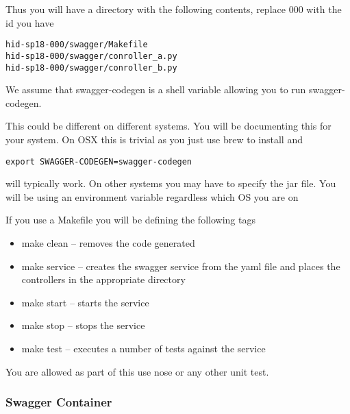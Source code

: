 \begin{exercise}
 

Thus you will have a directory with the following contents, replace
000 with the id you have

 
\begin{lstlisting}
hid-sp18-000/swagger/Makefile
hid-sp18-000/swagger/conroller_a.py
hid-sp18-000/swagger/conroller_b.py
\end{lstlisting}
 

We assume that swagger-codegen is a shell variable allowing you to run
swagger-codegen.

This could be different on different systems. You will be documenting
this for your system. On OSX this is trivial as you just use brew to
install and

\begin{lstlisting}
export SWAGGER-CODEGEN=swagger-codegen
\end{lstlisting}
 
will typically work. On other systems you may have to specify the jar
file. You will be using an environment variable regardless which OS
you are on

If you use a Makefile you will be defining the following tags

 
\begin{itemize}
\item make clean -- removes the code generated

\item make service -- creates the swagger service from the yaml file
  and places the controllers in the appropriate directory

\item make start  -- starts the service

\item make stop -- stops the service

\item make test -- executes a number of tests against the service
\end{itemize}

You are allowed as part of this use nose or any other unit test. 

\end{exercise}

\subsubsection{Swagger Container}

